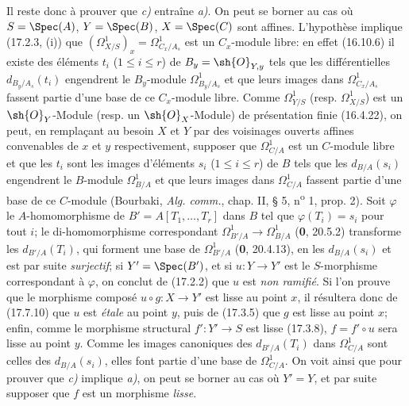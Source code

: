 Il reste donc à prouver que \emph{c)} entraîne \emph{a)}. On peut se borner au cas où $S=\Spec(A)$, $Y=\Spec(B)$, $X=\Spec(C)$ sont affines. L'hypothèse implique (17.2.3, (i)) que $(\varOmega^1_{X/S})_x=\Omega^1_{C_x/A_s}$ est un $C_x$-module libre: en effet (16.10.6) il existe des éléments $t_i$ ($1\leq i\leq r$) de $B_y=\sh{O}_{Y,y}$ tels que les différentielles $d_{B_y/A_s}(t_i)$ engendrent le $B_y$-module $\Omega^1_{B_y/A_s}$ et que leurs images dans $\Omega^1_{C_x/A_s}$ fassent partie d'une base de ce $C_x$-module libre. Comme $\varOmega^1_{Y/S}$ (resp. $\varOmega^1_{X/S}$) est un $\sh{O}_Y$-Module (resp. un $\sh{O}_X$-Module) de présentation finie (16.4.22), on peut, en remplaçant au besoin $X$ et $Y$ par des voisinages ouverts affines convenables de $x$ et $y$ respectivement, supposer que $\Omega^1_{C/A}$ est un $C$-module libre et que les $t_i$ sont les images d'éléments $s_i$ ($1\leq i\leq r$) de $B$ tels que les $d_{B/A}(s_i)$ engendrent le $B$-module $\Omega^1_{B/A}$ et que leurs images dans $\Omega^1_{C/A}$ fassent partie d'une base de ce $C$-module (Bourbaki, \emph{Alg. comm.}, chap. II, § 5, n\textsuperscript{o} 1, prop. 2). Soit $\varphi$ le $A$-homomorphisme de $B'=A[T_1,\ldots,T_r]$ dans $B$ tel que $\varphi(T_i)=s_i$ pour tout $i$; le di-homomorphisme correspondant $\Omega^1_{B'/A}\to\Omega^1_{B/A}$ (\textbf{0}, 20.5.2) transforme les $d_{B'/A}(T_i)$, qui forment une base de $\Omega^1_{B'/A}$ (\textbf{0}, 20.4.13), en les $d_{B/A}(s_i)$ et est par suite \emph{surjectif}; si $Y'=\Spec(B')$, et si $u:Y\to Y'$ est le $S$-morphisme correspondant à $\varphi$, on conclut de (17.2.2) que $u$ est \emph{non ramifié}. Si l'on prouve que le morphisme composé $u\circ g:X\to Y'$ est lisse au point $x$, il résultera donc de (17.7.10) que $u$ est \emph{étale} au point $y$, puis de (17.3.5) que $g$ est lisse au point $x$; enfin, comme le morphisme structural $f':Y'\to S$ est lisse (17.3.8), $f=f'\circ u$ sera lisse au point $y$. Comme les images canoniques des $d_{B'/A}(T_i)$ dans $\Omega^1_{C/A}$ sont celles des $d_{B/A}(s_i)$, elles font partie d'une base de $\Omega^1_{C/A}$. On voit ainsi que pour prouver que \emph{c)} implique \emph{a)}, on peut se borner au cas où $Y'=Y$, et par suite supposer que $f$ est un morphisme \emph{lisse}.

